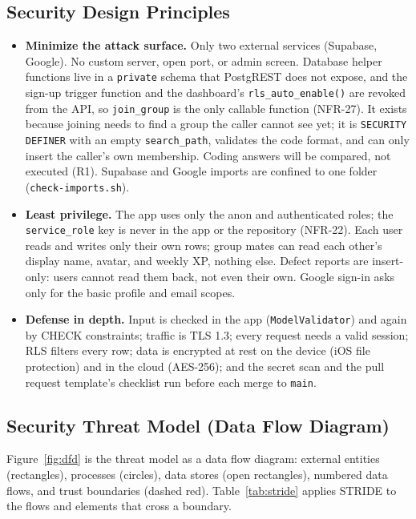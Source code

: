 \documentclass[12pt,letterpaper]{article}
\begin{document}
\subsection{Security Design Principles}
\begin{itemize}
  \item \textbf{Minimize the attack surface.} Only two external services (Supabase,
        Google). No custom server, open port, or admin screen. Database helper
        functions live in a \texttt{private} schema that PostgREST does not expose,
        and the sign-up trigger function and the dashboard's
        \texttt{rls\_auto\_enable()} are revoked from the API, so \texttt{join\_group}
        is the only callable function (NFR-27). It exists because joining needs to find
        a group the caller cannot see yet; it is \texttt{SECURITY DEFINER} with an
        empty \texttt{search\_path}, validates the code format, and can only insert
        the caller's own membership. Coding answers will be compared, not executed
        (R1). Supabase and Google imports are confined to one folder
        (\texttt{check-imports.sh}).
  \item \textbf{Least privilege.} The app uses only the anon and authenticated roles;
        the \texttt{service\_role} key is never in the app or the repository (NFR-22).
        Each user reads and writes only their own rows; group mates can read each
        other's display name, avatar, and weekly XP, nothing else. Defect reports are
        insert-only: users cannot read them back, not even their own. Google sign-in
        asks only for the basic profile and email scopes.
  \item \textbf{Defense in depth.} Input is checked in the app (\texttt{ModelValidator})
        and again by CHECK constraints; traffic is TLS 1.3; every request needs a valid
        session; RLS filters every row; data is encrypted at rest on the device (iOS
        file protection) and in the cloud (AES-256); and the secret scan and the pull
        request template's checklist run before each merge to \texttt{main}.
\end{itemize}

\subsection{Security Threat Model (Data Flow Diagram)}
Figure~\ref{fig:dfd} is the threat model as a data flow diagram: external entities
(rectangles), processes (circles), data stores (open rectangles), numbered data flows,
and trust boundaries (dashed red). Table~\ref{tab:stride} applies STRIDE to the flows
and elements that cross a boundary.
\end{document}
